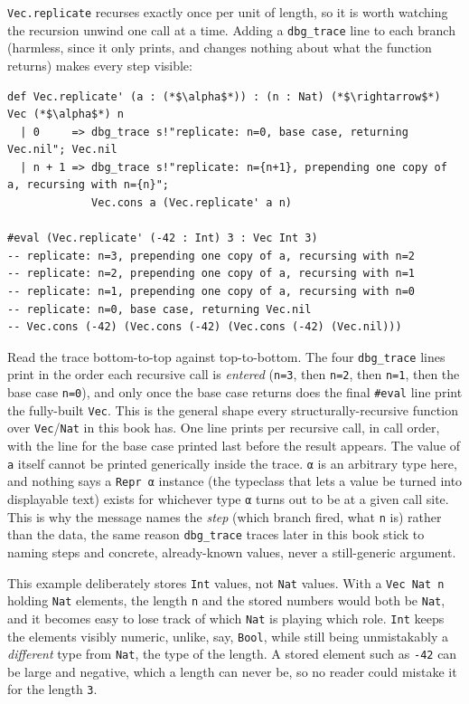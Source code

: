 \texttt{Vec.replicate} recurses exactly once per unit of length, so it is worth watching the recursion unwind one call at a time. Adding a \texttt{dbg\_\allowbreak{}trace} line to each branch (harmless, since it only prints, and changes nothing about what the function returns) makes every step visible:

\begin{lstlisting}
def Vec.replicate' (a : (*$\alpha$*)) : (n : Nat) (*$\rightarrow$*) Vec (*$\alpha$*) n
  | 0     => dbg_trace s!"replicate: n=0, base case, returning Vec.nil"; Vec.nil
  | n + 1 => dbg_trace s!"replicate: n={n+1}, prepending one copy of a, recursing with n={n}";
             Vec.cons a (Vec.replicate' a n)

#eval (Vec.replicate' (-42 : Int) 3 : Vec Int 3)
-- replicate: n=3, prepending one copy of a, recursing with n=2
-- replicate: n=2, prepending one copy of a, recursing with n=1
-- replicate: n=1, prepending one copy of a, recursing with n=0
-- replicate: n=0, base case, returning Vec.nil
-- Vec.cons (-42) (Vec.cons (-42) (Vec.cons (-42) (Vec.nil)))
\end{lstlisting}

Read the trace bottom-to-top against top-to-bottom. The four \texttt{dbg\_\allowbreak{}trace} lines print in the order each recursive call is \emph{entered} (\texttt{n=3}, then \texttt{n=2}, then \texttt{n=1}, then the base case \texttt{n=0}), and only once the base case returns does the final \texttt{\#eval} line print the fully-built \texttt{Vec}. This is the general shape every structurally-recursive function over \texttt{Vec}/\texttt{Nat} in this book has. One line prints per recursive call, in call order, with the line for the base case printed last before the result appears. The value of \texttt{a} itself cannot be printed generically inside the trace. \texttt{α} is an arbitrary type here, and nothing says a \texttt{Repr α} instance (the typeclass that lets a value be turned into displayable text) exists for whichever type \texttt{α} turns out to be at a given call site. This is why the message names the \emph{step} (which branch fired, what \texttt{n} is) rather than the data, the same reason \texttt{dbg\_\allowbreak{}trace} traces later in this book stick to naming steps and concrete, already-known values, never a still-generic argument.

This example deliberately stores \texttt{Int} values, not \texttt{Nat} values. With a \texttt{Vec Nat n} holding \texttt{Nat} elements, the length \texttt{n} and the stored numbers would both be \texttt{Nat}, and it becomes easy to lose track of which \texttt{Nat} is playing which role. \texttt{Int} keeps the elements visibly numeric, unlike, say, \texttt{Bool}, while still being unmistakably a \emph{different} type from \texttt{Nat}, the type of the length. A stored element such as \texttt{-\allowbreak{}42} can be large and negative, which a length can never be, so no reader could mistake it for the length \texttt{3}.

